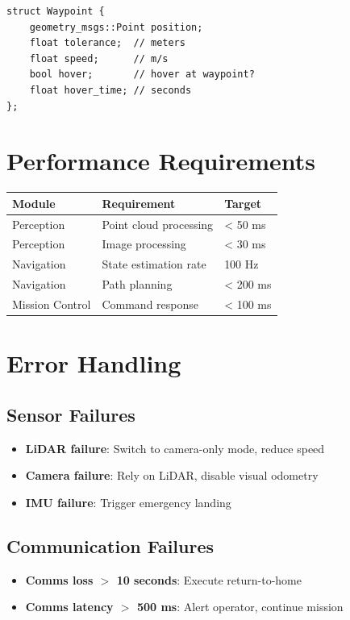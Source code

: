 \documentclass[11pt,a4paper]{article}
\begin{document}
\begin{verbatim}
struct Waypoint {
    geometry_msgs::Point position;
    float tolerance;  // meters
    float speed;      // m/s
    bool hover;       // hover at waypoint?
    float hover_time; // seconds
};
\end{verbatim}

\section{Performance Requirements}

\begin{table}[h]
\centering
\begin{tabular}{lll}
\toprule
\textbf{Module} & \textbf{Requirement} & \textbf{Target} \\
\midrule
Perception & Point cloud processing & < 50 ms \\
Perception & Image processing & < 30 ms \\
Navigation & State estimation rate & 100 Hz \\
Navigation & Path planning & < 200 ms \\
Mission Control & Command response & < 100 ms \\
\bottomrule
\end{tabular}
\end{table}

\section{Error Handling}

\subsection{Sensor Failures}

\begin{itemize}
    \item \textbf{LiDAR failure}: Switch to camera-only mode, reduce speed
    \item \textbf{Camera failure}: Rely on LiDAR, disable visual odometry
    \item \textbf{IMU failure}: Trigger emergency landing
\end{itemize}

\subsection{Communication Failures}

\begin{itemize}
    \item \textbf{Comms loss $>$ 10 seconds}: Execute return-to-home
    \item \textbf{Comms latency $>$ 500 ms}: Alert operator, continue mission
\end{itemize}
\end{document}

